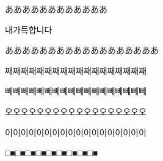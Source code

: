 \documentclass[a4paper,uplatex]{jsarticle}
\begin{document}
ああああああああああああ\par
\foreignlanguage{korean}{내가득합니다}%
\foreignlanguage{korean}{}\par
ああああああああああああああああああ\par
\foreignlanguage{korean}{째째째째째째째째째째째째째째째째째째}\par
\foreignlanguage{korean}{뻬뻬뻬뻬뻬뻬뻬뻬뻬뻬뻬뻬뻬뻬뻬뻬뻬뻬}\par
\foreignlanguage{korean}{오오오오오오오오오오오오오오오오오오}\par
\foreignlanguage{korean}{이이이이이이이이이이이이이이이이이이}\par
\foreignlanguage{korean}{□■□■□■□■□■□■□■□■□■}\par
\foreignlanguage{korean}{}\par
\foreignlanguage{korean}{}\par
\foreignlanguage{korean}{}\par
\foreignlanguage{korean}{}\par
\foreignlanguage{korean}{}
\end{document}
